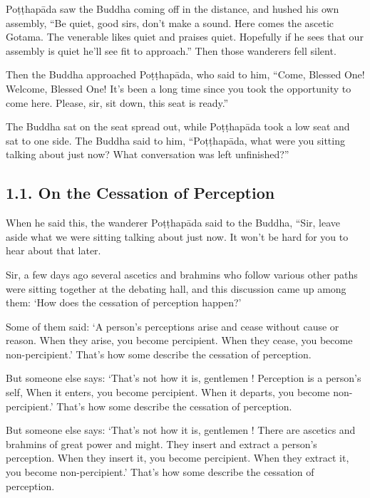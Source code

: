 \documentclass[12pt,openany]{book}%
\begin{document}
\textsanskrit{Poṭṭhapāda} saw the Buddha coming off in the distance, and hushed his own assembly, “Be quiet, good sirs, don’t make a sound. Here comes the ascetic Gotama. The venerable likes quiet and praises quiet. Hopefully if he sees that our assembly is quiet he’ll see fit to approach.” Then those wanderers fell silent. 

Then the Buddha approached \textsanskrit{Poṭṭhapāda}, who said to him, “Come, Blessed One! Welcome, Blessed One! It’s been a long time since you took the opportunity to come here. Please, sir, sit down, this seat is ready.” 

The Buddha sat on the seat spread out, while \textsanskrit{Poṭṭhapāda} took a low seat and sat to one side. The Buddha said to him, “\textsanskrit{Poṭṭhapāda}, what were you sitting talking about just now? What conversation was left unfinished?” 

\subsection*{1.1. On the Cessation of Perception }

When he said this, the wanderer \textsanskrit{Poṭṭhapāda} said to the Buddha, “Sir, leave aside what we were sitting talking about just now. It won’t be hard for you to hear about that later. 

Sir, a few days ago several ascetics and brahmins who follow various other paths were sitting together at the debating hall, and this discussion came up among them: ‘How does the cessation of perception happen?’ 

Some of them said: ‘A person’s perceptions arise and cease without cause or reason. When they arise, you become percipient. When they cease, you become non-percipient.’ That’s how some describe the cessation of perception. 

But someone else says: ‘That’s not how it is, gentlemen ! Perception is a person’s self, When it enters, you become percipient. When it departs, you become non-percipient.’ That’s how some describe the cessation of perception. 

But someone else says: ‘That’s not how it is, gentlemen ! There are ascetics and brahmins of great power and might. They insert and extract a person’s perception. When they insert it, you become percipient. When they extract it, you become non-percipient.’ That’s how some describe the cessation of perception. 
\end{document}

